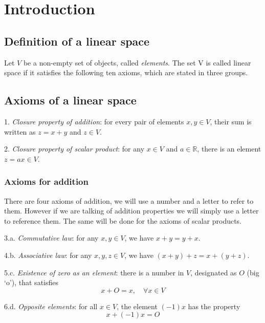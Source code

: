\documentclass{book}
\begin{document}
\mainmatter
\chapter{Introduction}
\section{Definition of a linear space}
Let $V$ be a non-empty set of objects, called \textit{elements}. The set V is
called linear space if it satisfies the following ten axioms, which are stated
in three groups.

\section*{Axioms of a linear space}

\begin{list}{Axiom}{}
    \item 1.\textit{ Closure property of addition}: for every pair of elements $x,y\in V$, their sum is written as $z=x+y$ and $z\in V$.
    \item 2.\textit{ Closure property of scalar product}: for any $x\in V$ and $a\in\mathbb R$, there is an element $z=ax\in V$.
\end{list}

\subsection*{Axioms for addition}

There are four axioms of addition, we will use a number and a letter to refer
to them. However if we are talking of addition properties we will simply use a
letter to reference them. The same will be done for the axioms of scalar
products.

\begin{list}{Axiom}{}
    \item 3.a.\textit{ Commutative law}: for any $x,y\in V$, we have $x+y = y+x$.
    \item 4.b.\textit{ Associative law}: for any $x,y,z\in V$, we have $(x+y) + z = x + (y + z)$.
    \item 5.c.\textit{ Existence of zero as an element}: there is a number in $V$, designated as $O$ (big `o'), that satisfies
          \[
              x + O = x,\quad \forall x \in V
          \]

    \item 6.d.\textit{ Opposite elements}: for all $x\in V$, the element $(-1)x$ has the property
          \[
              x + (-1)x = O
          \]
\end{list}
\end{document}
